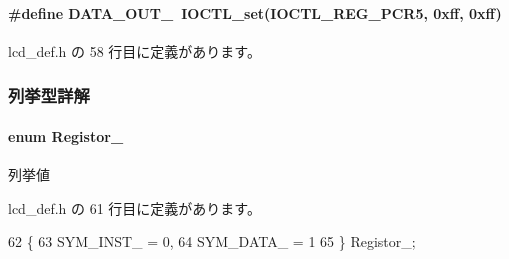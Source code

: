 \paragraph[{D\+A\+T\+A\+\_\+\+O\+U\+T\+\_\+}]{\setlength{\rightskip}{0pt plus 5cm}\#define D\+A\+T\+A\+\_\+\+O\+U\+T\+\_\+~I\+O\+C\+T\+L\+\_\+set(I\+O\+C\+T\+L\+\_\+\+R\+E\+G\+\_\+\+P\+C\+R5, 0xff, 0xff)}\label{lcd__def_8h_a7fae5e07acd0bb4bfa6786ccbc5d964b_a7fae5e07acd0bb4bfa6786ccbc5d964b}


 lcd\+\_\+def.\+h の 58 行目に定義があります。



\subsubsection{列挙型詳解}
\paragraph[{Registor\+\_\+}]{\setlength{\rightskip}{0pt plus 5cm}enum {\bf Registor\+\_\+}}\label{lcd__def_8h_a409a9c208df333e5f6cf67c0866df0df_a409a9c208df333e5f6cf67c0866df0df}
\begin{Desc}
\item[列挙値]\par
\begin{description}
\item[{\em 
S\+Y\+M\+\_\+\+I\+N\+S\+T\+\_\+\label{lcd__def_8h_a409a9c208df333e5f6cf67c0866df0df_a409a9c208df333e5f6cf67c0866df0dfac4d4880849422ed699296cb735855884}
}]\item[{\em 
S\+Y\+M\+\_\+\+D\+A\+T\+A\+\_\+\label{lcd__def_8h_a409a9c208df333e5f6cf67c0866df0df_a409a9c208df333e5f6cf67c0866df0dfaef83c96025f52216a682cc3d05b255cf}
}]\end{description}
\end{Desc}


 lcd\+\_\+def.\+h の 61 行目に定義があります。


\begin{DoxyCode}
62 \{
63     SYM_INST_ = 0,
64     SYM_DATA_ = 1
65 \} Registor_;
\end{DoxyCode}
